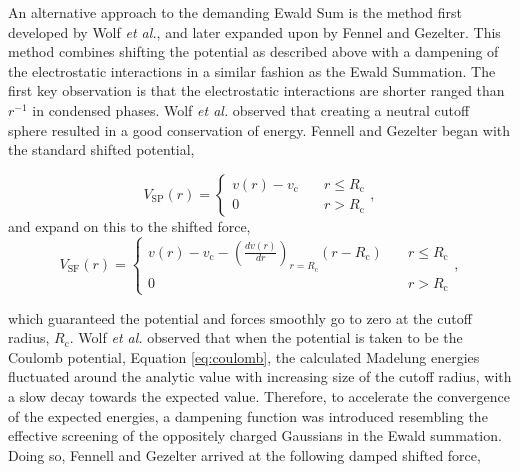 An alternative approach to the demanding Ewald Sum is the method first
developed by Wolf \textit{et al.}\cite{Wolf1999}, and later expanded
upon by Fennel and Gezelter.\cite{Fennell2006} This method combines
shifting the potential as described above with a dampening of the
electrostatic interactions in a similar fashion as the Ewald
Summation. The first key observation is that the electrostatic
interactions are shorter ranged than $r^{-1}$ in condensed
phases. Wolf \textit{et al.}  observed that creating a neutral cutoff
sphere resulted in a good conservation of energy. Fennell and Gezelter
began with the standard shifted potential,

\begin{equation}
V_\textrm{SP}(r) =      \begin{cases}
v(r)-v_\textrm{c} &\quad r\leqslant R_\textrm{c} \\ 0 &\quad r >
R_\textrm{c}  
\end{cases},
\label{eq:shiftingPotForm}
\end{equation}
and expand on this to the shifted force,
\begin{equation}
V_\textrm{SF}(r) =      \begin{cases}
v(r)-v_\textrm{c}-\left(\frac{d v(r)}{d r}\right)_{r=R_\textrm{c}}(r-R_\textrm{c
})
&\quad r\leqslant R_\textrm{c} \\ 0 &\quad r > R_\textrm{c} 
                                                \end{cases},
\label{eq:shiftingForm}
\end{equation}

which guaranteed the potential and forces smoothly go to zero at the
cutoff radius, $R_\textrm{c}$. Wolf \textit{et al.} observed that when
the potential is taken to be the Coulomb potential, Equation
\ref{eq:coulomb}, the calculated Madelung energies fluctuated around
the analytic value with increasing size of the cutoff radius, with a
slow decay towards the expected value.\cite{Wolf1999} Therefore, to
accelerate the convergence of the expected energies, a dampening
function was introduced resembling the effective screening of the
oppositely charged Gaussians in the Ewald summation. Doing so, Fennell
and Gezelter arrived at the following damped shifted force,

